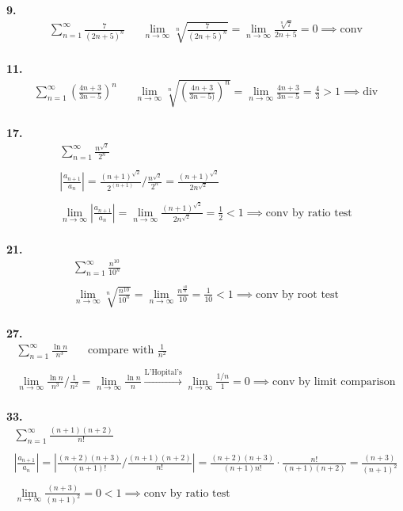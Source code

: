 \documentclass{article}
\begin{document}
\noindent
\textbf{9.}
\begin{gather*}
\sum_{n=1}^{\infty} \frac{7}{(2n+5)^n}
~~~~~~~
\lim_{n \to \infty} \sqrt[n]{\frac{7}{(2n+5)^n}}
=\lim_{n \to \infty} \frac{\sqrt[n]{7}}{2n+5} = 0 \implies \text{conv}
\end{gather*}
\hfill
\\



\noindent
\textbf{11.}
\begin{gather*}
\sum_{n=1}^{\infty} \left( \frac{4n+3}{3n-5} \right)^n
~~~~~~~
\lim_{n \to \infty} \sqrt[n]{ \left( \frac{4n+3}{3n-5)} \right)^n}
=\lim_{n \to \infty} \frac{4n+3}{3n-5} = \frac{4}{3} > 1 \implies \text{div}
\end{gather*}
\hfill
\\



\noindent
\textbf{17.}
\begin{gather*}
\sum_{n=1}^{\infty} \frac{n^{\sqrt{2}}}{2^n}
\\
\\
\left|
\frac{a_{n+1}}{a_n}
\right|
=\frac{(n+1)^{\sqrt{2}}}{2^{(n+1)}} / \frac{n^{\sqrt{2}}}{2^n}
=\frac{(n+1)^{\sqrt{2}}}{2n^{\sqrt{2}}}
\\
\\
\lim_{n \to \infty} 
\left|
\frac{a_{n+1}}{a_n}
\right|
=
\lim_{n \to \infty} 
\frac{(n+1)^{\sqrt{2}}}{2n^{\sqrt{2}}}=\frac{1}{2}<1 \implies \text{conv by ratio test}
\end{gather*}
\hfill
\\

\noindent
\textbf{21.}
\begin{gather*}
\sum_{n=1}^{\infty} \frac{n^{10}}{10^n}
\\
\\
\lim_{n \to \infty} \sqrt[n]{\frac{n^{10}}{10^n}}=\lim_{n \to \infty} \frac{n^{\frac{10}{n}}}{10}
=\frac{1}{10}<1 \implies \text{conv by root test}
\end{gather*}
\hfill
\\




\noindent
\textbf{27.}
\begin{gather*}
\sum_{n=1}^{\infty} \frac{\ln n}{n^3}
~~~~~~~~
\text{compare with } \frac{1}{n^2}
\\
\\
\lim_{n \to \infty} \frac{\ln n}{n^3} / \frac{1}{n^2}
=\lim_{n \to \infty} \frac{\ln n}{n}
\xrightarrow{\text{L'Hopital's}}\lim_{n \to \infty} \frac{1/n}{1}=0
\implies \text{conv by limit comparison}
\end{gather*}
\hfill
\\


\noindent
\textbf{33.}
\begin{gather*}
\sum_{n=1}^{\infty} \frac{(n+1)(n+2)}{n!}
\\
\\
\left| \frac{a_{n+1}}{a_n} \right|
=\left| \frac{(n+2)(n+3)}{(n+1)!} / \frac{(n+1)(n+2)}{n!} \right|
=\frac{(n+2)(n+3)}{(n+1)n!} \cdot \frac{n!}{(n+1)(n+2)}
=\frac{(n+3)}{(n+1)^2}
\\
\\
\lim_{n \to \infty} \frac{(n+3)}{(n+1)^2} = 0<1
\implies \text{conv by ratio test}
\end{gather*}
\end{document}
